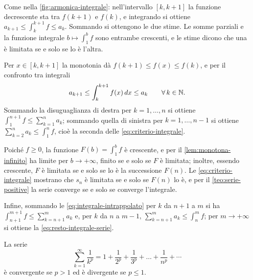 \begin{schema}
\Ipotesi{$f$ continua, $f\ge0$, decrescente in $[1,+\infty)$; \ $a_{k}=f(k)$.}
\end{schema}

\begin{strategia}
Come nella \cref{fig:armonica-integrale}: nell'intervallo $[k,k+1]$ la funzione
decrescente sta tra $f(k+1)$ e $f(k)$, e integrando si ottiene
$a_{k+1}\le\int_{k}^{k+1}f\le a_{k}$. Sommando si ottengono le due stime. Le somme parziali e la
funzione integrale $b\mapsto\int_{1}^{b}f$ sono entrambe crescenti, e le stime dicono che una è
limitata se e solo se lo è l'altra.
\end{strategia}

\begin{dimostrazione}
Per $x\in[k,k+1]$ la monotonia dà $f(k+1)\le f(x)\le f(k)$, e per il confronto tra
integrali
\begin{equation}\label{eq:integrale-intrappolato}
  a_{k+1}\le\int_{k}^{k+1}f(x)\,dx\le a_{k} \qquad\forall\, k\in\mathbb{N} .
\end{equation}
Sommando la disuguaglianza di destra per $k=1,\dots,n$ si ottiene
$\int_{1}^{n+1}f\le\sum_{k=1}^{n}a_{k}$; sommando quella di sinistra per $k=1,\dots,n-1$ si ottiene
$\sum_{k=2}^{n}a_{k}\le\int_{1}^{n}f$, cioè la seconda delle \eqref{eq:criterio-integrale}.

Poiché $f\ge0$, la funzione $F(b)=\int_{1}^{b}f$ è crescente, e per il \cref{lem:monotona-infinito}
ha limite per $b\to+\infty$, finito se e solo se $F$ è limitata; inoltre, essendo crescente,
$F$ è limitata se e solo se lo è la successione $F(n)$. Le \eqref{eq:criterio-integrale}
mostrano che $s_{n}$ è limitata se e solo se $F(n)$ lo è, e per il \cref{teo:serie-positive}
la serie converge se e solo se converge l'integrale.

Infine, sommando le \eqref{eq:integrale-intrappolato} per $k$ da $n+1$ a $m$ si ha
$\int_{n+1}^{m+1}f\le\sum_{k=n+1}^{m}a_{k}$ e, per $k$ da $n$ a $m-1$, $\sum_{k=n+1}^{m}a_{k}\le\int_{n}^{m}f$;
per $m\to+\infty$ si ottiene la \eqref{eq:resto-integrale-serie}.
\end{dimostrazione}

\begin{teorema}\label{teo:armonica-generalizzata}
La serie
\begin{equation}\label{eq:armonica-generalizzata}
  \sum_{k=1}^{\infty}\frac1{k^{p}}=1+\frac1{2^{p}}+\frac1{3^{p}}+\dots+\frac1{n^{p}}+\cdots
\end{equation}
è convergente se $p>1$ ed è divergente se $p\le1$.
\end{teorema}

